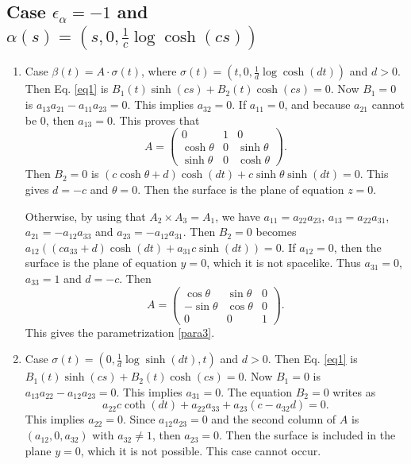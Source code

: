 \documentclass[a4paper,12pt]{amsart}
\numberwithin{equation}{section}
\theoremstyle{definition}
\begin{document}
\subsection{Case $\epsilon_\alpha=-1$ and $\alpha(s)=(s,0,\frac{1}{c}\log\cosh(c s))$}
\begin{enumerate}
\item   Case  $\beta(t)=A\cdot\sigma(t)$, where  $\sigma(t)=(t,0, \frac{1}{d}\log\cosh(dt))$ and $d>0$.  Then Eq. \eqref{eq1} is  $B_1(t)\sinh(cs)+B_2(t)\cosh(cs)=0$. Now $B_1=0$ is $a_{13} a_{21}-a_{11} a_{23}=0$. 
This implies $a_{32}=0$. If $a_{11}=0$, and because $a_{21}$ cannot be $0$, then $a_{13}=0$. This proves that 
$$A=\begin{pmatrix}0&1&0\\ \cosh\theta&0&\sinh\theta\\ \sinh\theta&0&\cosh\theta\end{pmatrix}.$$
Then $B_2=0$ is $(c\cosh\theta+d)\cosh(dt)+c\sinh\theta\sinh(dt)=0$. This gives $d=-c$ and $\theta=0$. Then the surface is the plane of equation $z=0$.


Otherwise, by using that $A_2\times A_3=A_1$, we have $a_{11}=a_{22}a_{23}$, $a_{13}=a_{22}a_{31}$, $a_{21}=-a_{12}a_{33}$ and $a_{23}=-a_{12}a_{31}$. Then $B_2=0$ becomes $a_{12}\left((ca_{33}+ d)\cosh(dt)+a_{31}c\sinh(dt)\right)=0$. If $a_{12}=0$, then the surface is the plane of equation $y=0$, which it is not spacelike. Thus $a_{31}=0$, $a_{33}=1$ and $d=-c$. Then 
$$A=\begin{pmatrix}\cos\theta&\sin\theta&0\\ -\sin\theta&\cos\theta&0\\ 0&0&1\end{pmatrix}.$$
This gives the parametrization \eqref{para3}.
  
\item Case   $\sigma(t)=(0, \frac{1}{d}\log\sinh(dt),t)$ and $d>0$.  Then Eq. \eqref{eq1} is  $B_1(t)\sinh(cs)+B_2(t)\cosh(cs)=0$. Now $B_1=0$ is $a_{13} a_{22}-a_{12} a_{23}=0$. 
This implies $a_{31}=0$. The equation $B_2=0$ writes as 
$$a_{22}c\coth(dt)+a_{22}a_{33}+a_{23}(c-a_{32}d)=0.$$
This implies $a_{22}=0$. Since $a_{12}a_{23}=0$ and the second column of $A$ is $(a_{12},0,a_{32})$ with $a_{32}\not=1$, then $a_{23}=0$. Then the surface is included in the plane $y=0$, which it is not possible. This case cannot occur. 


\end{enumerate}
\end{document}
